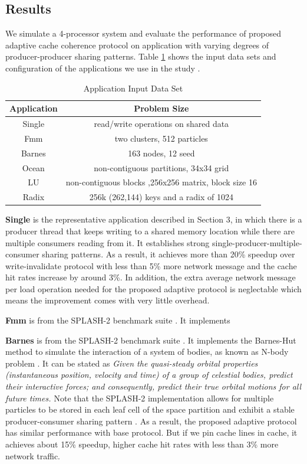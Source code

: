 \documentclass[conference]{IEEEtran}
\begin{document}
\subsection{Results}
We simulate a 4-processor system and evaluate the performance of proposed adaptive cache coherence protocol on application with varying degrees of producer-producer sharing patterns. Table \ref{app} shows the input data sets and configuration of the applications we use in the study \cite{splash}.

\begin{table}[!h]
\renewcommand{\arraystretch}{2.5}
\caption{Application Input Data Set}
\label{app}
\centering
\begin{tabular}{|c|c|}
\hline
Application & Problem Size\\
\hline
Single & read/write operations on shared data\\
\hline
Fmm & two clusters, 512 particles\\
\hline
Barnes & 163 nodes, 12 seed\\
\hline
Ocean & non-contiguous partitions, 34x34 grid\\
\hline
LU & non-contiguous blocks ,256x256 matrix, block size 16\\
\hline
Radix & 256k (262,144) keys and a radix of 1024\\
\hline
\end{tabular}
\end{table}
\FloatBarrier

\textbf{Single} is the representative application described in Section 3, in which there is a producer thread that keeps writing to a shared memory location while there are multiple consumers reading from it. It establishes strong single-producer-multiple-consumer sharing patterns. As a result, it achieves more than 20\% speedup over write-invalidate protocol with less than 5\% more network message and the cache hit rates increase by around 3\%. In addition, the extra average network message per load operation needed for the proposed adaptive protocol is neglectable which means the improvement comes with very little overhead.

\textbf{Fmm} is from the SPLASH-2 benchmark suite \cite{splash}. It implements

\textbf{Barnes} is from the SPLASH-2 benchmark suite \cite{splash}. It implements the Barnes-Hut method to simulate the interaction of a system of bodies, as known as N-body problem \cite{nbody}. It can be stated as \textit{Given the quasi-steady orbital properties (instantaneous position, velocity and time) of a group of celestial bodies, predict their interactive forces; and consequently, predict their true orbital motions for all future times. \cite{nbody_wiki}} Note that the SPLASH-2 implementation allows for multiple particles to be stored in each leaf cell of the space partition and exhibit a stable producer-consumer sharing pattern \cite{barnes}. As a result, the proposed adaptive protocol has similar performance with base protocol. But if we pin cache lines in cache, it achieves about 15\% speedup, higher cache hit rates with less than 3\% more network traffic.
\end{document}
